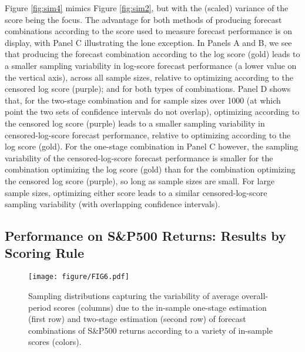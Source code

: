 \documentclass[12pt]{article}
\theoremstyle{definition}
\theoremstyle{remark}
\begin{document}
Figure \ref{fig:sim4} mimics Figure \ref{fig:sim2}, but with the (scaled) variance of the score being the focus. The advantage for both methods of producing forecast combinations according to the score used to measure forecast performance is on display, with Panel C illustrating the lone exception. In Panels A and B, we see that producing the forecast combination according to the log score (gold) leads to a smaller sampling variability in log-score forecast performance (a lower value on the vertical axis), across all sample sizes, relative to optimizing according to the censored log score (purple); and for both types of combinations. Panel D shows that, for the two-stage combination and for sample sizes over 1000 (at which point the two sets of confidence intervals do not overlap), optimizing according to the censored log score (purple) leads to a smaller sampling variability in censored-log-score forecast performance, relative to optimizing according to the log score (gold). For the one-stage combination in Panel C however, the sampling variability of the censored-log-score forecast performance is smaller for the combination optimizing the log score (gold) than for the combination optimizing the censored log score (purple), so long as sample sizes are small. For large sample sizes, optimizing either score leads to a similar censored-log-score sampling variability (with overlapping confidence intervals).

\subsection{Performance on S\&P500 Returns: Results by Scoring Rule\label{subsec:empbyscore}}

\begin{figure}[!ht]
\texttt{[image: figure/FIG6.pdf]}
\caption{Sampling distributions capturing the variability of average overall-period scores (columns) due to the in-sample one-stage estimation (first row) and two-stage estimation (second row) of forecast combinations of S\&P500 returns according to a variety of in-sample scores (colors).}
\label{fig:emp3}
\end{figure}
\end{document}
